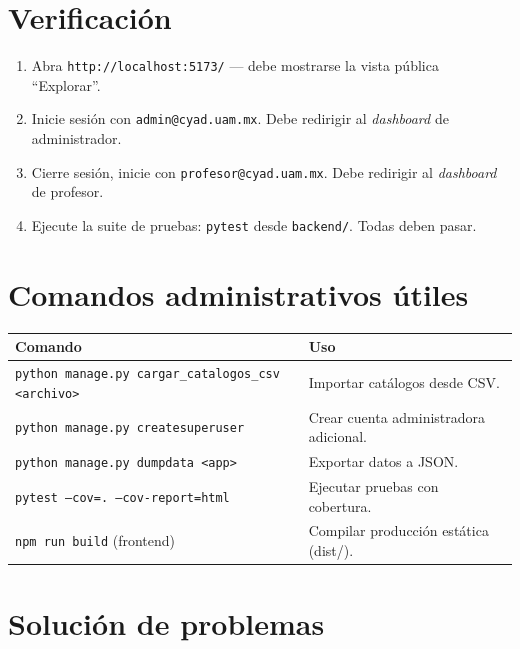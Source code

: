 \documentclass{computacion}
\begin{document}
\section{Verificación}

\begin{enumerate}
    \item Abra \texttt{http://localhost:5173/} — debe mostrarse la vista pública ``Explorar''.
    \item Inicie sesión con \texttt{admin@cyad.uam.mx}. Debe redirigir al \emph{dashboard} de administrador.
    \item Cierre sesión, inicie con \texttt{profesor@cyad.uam.mx}. Debe redirigir al \emph{dashboard} de profesor.
    \item Ejecute la suite de pruebas: \texttt{pytest} desde \texttt{backend/}. Todas deben pasar.
\end{enumerate}

\section{Comandos administrativos útiles}

\begin{longtable}{p{} p{}}
    \toprule
    \textbf{Comando} & \textbf{Uso} \\
    \midrule
    \endhead
    \texttt{python manage.py cargar\_catalogos\_csv <archivo>} & Importar catálogos desde CSV. \\
    \midrule
    \texttt{python manage.py createsuperuser} & Crear cuenta administradora adicional. \\
    \midrule
    \texttt{python manage.py dumpdata <app>} & Exportar datos a JSON. \\
    \midrule
    \texttt{pytest --cov=. --cov-report=html} & Ejecutar pruebas con cobertura. \\
    \midrule
    \texttt{npm run build} (frontend) & Compilar producción estática (dist/). \\
    \bottomrule
\end{longtable}

\section{Solución de problemas}
\end{document}
